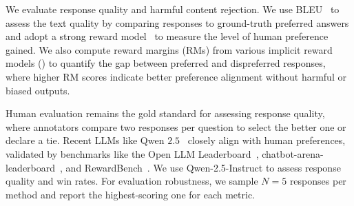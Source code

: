  We evaluate response quality and harmful content rejection. We use BLEU~\cite{bleu} to assess the text quality by comparing responses to ground-truth preferred answers and adopt a strong reward model~\cite{ArmoRM} to measure the level of human preference gained. We also compute reward margins (RMs) from various implicit reward models () to quantify the gap between preferred and dispreferred responses, where higher RM scores indicate better preference alignment without harmful or biased outputs.

Human evaluation remains the gold standard for assessing response quality, where annotators compare two responses per question to select the better one or declare a tie. Recent LLMs like Qwen $2.5$~\cite{qwen2.5} closely align with human preferences, validated by benchmarks like the Open LLM Leaderboard~\cite{llmbench}, chatbot-arena-leaderboard~\cite{chatarena}, and RewardBench~\cite{RewardBench}. We use Qwen-2.5-Instruct to assess response quality and win rates. For evaluation robustness, we sample $N=5$ responses per method and report the highest-scoring one for each metric.

%


